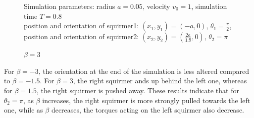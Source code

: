 \documentclass{article}
\begin{document}
\begin{figure}
\begin{minipage}{0.49\textwidth}
        \caption{\footnotesize $\beta = 3$}
    \end{minipage}
    Simulation parameters: radius $a=0.05$, velocity $v_0=1$, simulation time $T=0.8$\\
        position and orientation of squirmer1: $(x_1,y_1)=(-a,0)$, $\theta_1=\frac{\pi}{2}$,\\
        position and orientation of squirmer2: $(x_2,y_2)=(\frac{2a}{1.9},0)$, $\theta_2=\pi$
\end{figure}
For $\beta = -3$, the orientation at the end of the simulation is less altered compared to $\beta = -1.5$.
For $\beta = 3$, the right squirmer ands up behind the left one, whereas for $\beta = 1.5$, the right
squirmer is pushed away.
These results indicate that for $\theta_2 = \pi$, as $\beta$ increases, the right squirmer is more strongly pulled 
towards the left one, while as $\beta$ decreases, the torques acting on the left squirmer also decrease.
\end{document}
